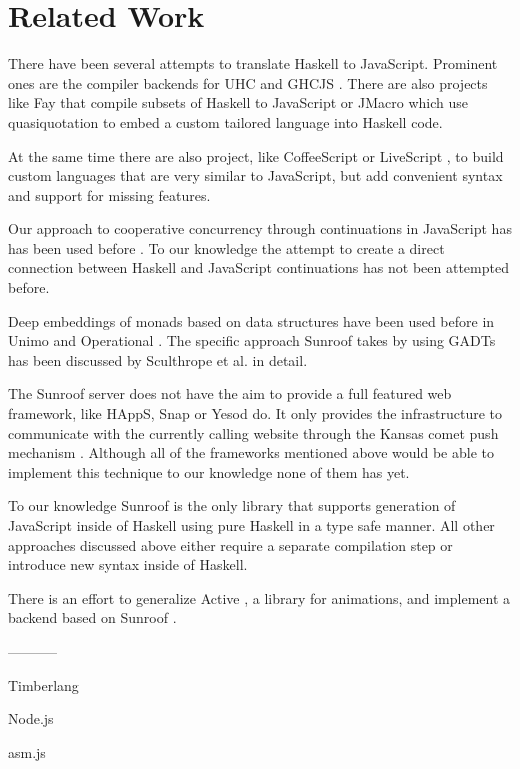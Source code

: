  
\section{Related Work}

There have been several attempts to translate Haskell to JavaScript.
Prominent ones are the compiler backends for 
UHC \cite{Stutterheim:12:ImprovingUHCJavaScriptBackend} and 
GHCJS \cite{project:ghcjs}. There are also projects like Fay \cite{project:fay} 
that compile subsets of Haskell to JavaScript or JMacro \cite{project:jmacro}
which use quasiquotation \cite{Mainland:07:QuasiquotingHaskell} to embed 
a custom tailored language into Haskell code.

At the same time there are also project, like 
CoffeeScript \cite{project:coffeescript} or LiveScript \cite{project:livescript},
to build custom languages 
that are very similar to JavaScript, but add convenient syntax and
support for missing features.

Our approach to cooperative concurrency through continuations in JavaScript has
has been used before 
\cite{Cooper:07:LinksWebProgrammingTiers,Predescu:02:CocoonContinuationBasedControlFlow}.
To our knowledge the attempt to create a direct connection
between Haskell and JavaScript continuations has not been 
attempted before.

Deep embeddings of monads based on data structures have been used before
in Unimo \cite{Lin:06:Unimo} and Operational \cite{Apfelmus:10:Operational,Hackage:10:Operational}. 
The specific approach Sunroof takes 
by using GADTs has been discussed by 
Sculthrope et al. \cite{Sculthorpe:13:ConstrainedMonads} 
in detail.

The Sunroof server does not have the aim to provide a full featured 
web framework, like HAppS, Snap or Yesod do. It only provides 
the infrastructure to communicate with the currently calling website
through the Kansas comet \cite{project:kansas-comet} 
push mechanism \cite{pattern:push}. Although all of the
frameworks mentioned above would be able to implement this technique
to our knowledge none of them has yet.

To our knowledge Sunroof is the only library that supports 
generation of JavaScript inside of Haskell using pure Haskell
in a type safe manner. All other approaches discussed above
either require a separate compilation step or introduce new 
syntax inside of Haskell. 

There is an effort to generalize Active \cite{project:active}, a library for animations, and
implement a backend based on Sunroof \cite{project:sunroof-active}.

-----------

Timberlang 


Node.js 

asm.js 



